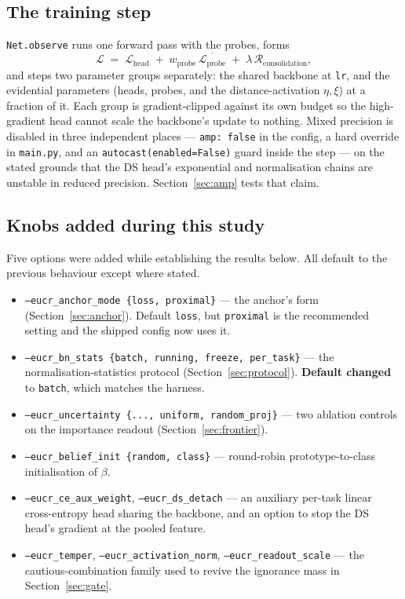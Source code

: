 \documentclass{article}
\begin{document}
\subsection{The training step}

\texttt{Net.observe} runs one forward pass with the probes, forms
\begin{equation}
\mathcal{L} \;=\; \mathcal{L}_{\text{head}}
\;+\; w_{\text{probe}}\,\overline{\mathcal{L}_{\text{probe}}}
\;+\; \lambda \, \mathcal{R}_{\text{consolidation}},
\end{equation}
and steps two parameter groups separately: the shared backbone at \texttt{lr},
and the evidential parameters (heads, probes, and the distance-activation
$\eta,\xi$) at a fraction of it. Each group is gradient-clipped against its own
budget so the high-gradient head cannot scale the backbone's update to nothing.
Mixed precision is disabled in three independent places --- \texttt{amp: false}
in the config, a hard override in \texttt{main.py}, and an
\texttt{autocast(enabled=False)} guard inside the step --- on the stated grounds
that the DS head's exponential and normalisation chains are unstable in reduced
precision. Section~\ref{sec:amp} tests that claim.


\subsection{Knobs added during this study}

Five options were added while establishing the results below. All default to the
previous behaviour except where stated.

\begin{itemize}
  \item \texttt{--eucr\_anchor\_mode \{loss, proximal\}} --- the anchor's form
        (Section~\ref{sec:anchor}). Default \texttt{loss}, but \texttt{proximal}
        is the recommended setting and the shipped config now uses it.
  \item \texttt{--eucr\_bn\_stats \{batch, running, freeze, per\_task\}} ---
        the normalisation-statistics protocol (Section~\ref{sec:protocol}).
        \textbf{Default changed} to \texttt{batch}, which matches the harness.
  \item \texttt{--eucr\_uncertainty \{...,\ uniform, random\_proj\}} --- two
        ablation controls on the importance readout (Section~\ref{sec:frontier}).
  \item \texttt{--eucr\_belief\_init \{random, class\}} --- round-robin
        prototype-to-class initialisation of $\beta$.
  \item \texttt{--eucr\_ce\_aux\_weight}, \texttt{--eucr\_ds\_detach} --- an
        auxiliary per-task linear cross-entropy head sharing the backbone, and
        an option to stop the DS head's gradient at the pooled feature.
  \item \texttt{--eucr\_temper}, \texttt{--eucr\_activation\_norm},
        \texttt{--eucr\_readout\_scale} --- the cautious-combination family used
        to revive the ignorance mass in Section~\ref{sec:gate}.
\end{itemize}
\end{document}
